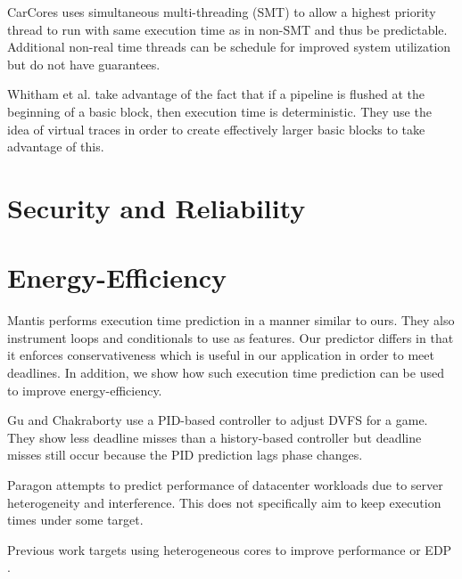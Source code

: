 CarCores \cite{carcores-arcs10} uses simultaneous multi-threading (SMT) to
allow a highest priority thread to run with same execution time as in non-SMT
and thus be predictable. Additional non-real time threads can be schedule for
improved system utilization but do not have guarantees.


Whitham et al. \cite{whitham-comp10} take advantage of the fact that if a
pipeline is flushed at the beginning of a basic block, then execution time is
deterministic. They use the idea of virtual traces in order to create
effectively larger basic blocks to take advantage of this.

\section{Security and Reliability}
\label{sec:related_work.security}

\section{Energy-Efficiency}
\label{sec:related_work.energy}

Mantis \cite{mantis-atc13} performs execution time prediction in a manner
similar to ours. They also instrument loops and conditionals to use as
features. Our predictor differs in that it enforces conservativeness which is
useful in our application in order to meet deadlines. In addition, we show how
such execution time prediction can be used to improve energy-efficiency.

Gu and Chakraborty \cite{gu-dac08} use a PID-based controller to adjust DVFS
for a game. They show less deadline misses than a history-based controller but
deadline misses still occur because the PID prediction lags phase changes.

Paragon \cite{paragon-asplos13} attempts to predict performance of datacenter
workloads due to server heterogeneity and interference. This does not
specifically aim to keep execution times under some target.

Previous work targets using heterogeneous cores to improve performance
\cite{paragon-asplos13, pie-isca12, heteroscouts-sigmetrics11} or EDP \cite{chen-dac09}.

